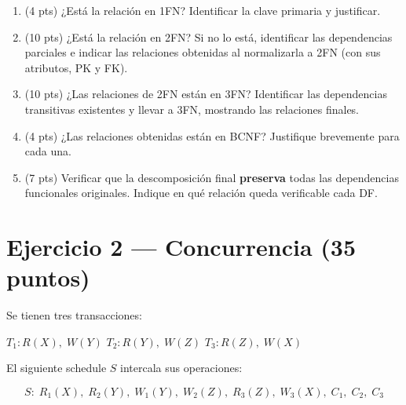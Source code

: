 \documentclass[11pt,a4paper]{article}
\begin{document}
\begin{enumerate}
  \item (4 pts) ¿Está la relación en 1FN? Identificar la clave primaria y justificar.

  \vspace{3cm}

  \item (10 pts) ¿Está la relación en 2FN? Si no lo está, identificar las dependencias parciales e indicar las relaciones obtenidas al normalizarla a 2FN (con sus atributos, PK y FK).

  \vspace{6cm}

  \item (10 pts) ¿Las relaciones de 2FN están en 3FN? Identificar las dependencias transitivas existentes y llevar a 3FN, mostrando las relaciones finales.

  \vspace{6cm}

  \item (4 pts) ¿Las relaciones obtenidas están en BCNF? Justifique brevemente para cada una.

  \vspace{3cm}

  \item (7 pts) Verificar que la descomposición final \textbf{preserva} todas las dependencias funcionales originales. Indique en qué relación queda verificable cada DF.

  \vspace{3.5cm}
\end{enumerate}

\newpage

\section*{Ejercicio 2 — Concurrencia \hfill\normalfont(35 puntos)}

Se tienen tres transacciones:

\begin{center}
$T_1: R(X),\; W(Y)$ \qquad
$T_2: R(Y),\; W(Z)$ \qquad
$T_3: R(Z),\; W(X)$
\end{center}

El siguiente schedule $S$ intercala sus operaciones:

\[
S:\; R_1(X),\; R_2(Y),\; W_1(Y),\; W_2(Z),\; R_3(Z),\; W_3(X),\; C_1,\; C_2,\; C_3
\]
\end{document}
